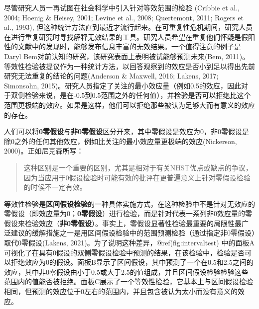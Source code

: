 \documentclass[
  letterpaper,
  DIV=11,
  numbers=noendperiod]{scrreprt}
\begin{document}
尽管研究人员一再试图在社会科学中引入针对等效范围的检验 (Cribbie et al.,
2004; Hoenig \& Heisey, 2001; Levine et al., 2008; Quertemont, 2011;
Rogers et al., 1993),
但这种统计方法直到最近才流行起来。在可重复性危机期间，研究人员在进行重复研究时寻找解释无效结果的工具。研究人员希望在重复他们怀疑是假阳性的文献中的发现时，能够发布信息丰富的无效结果。一个值得注意的例子是Daryl
Bem对前认知的研究，该研究表面上表明被试能够预测未来(Bem,
2011)。等效性检验被提议作为一种统计方法，以回答观察到的效应是否小到足以得出先前研究无法重复的结论的问题(Anderson
\& Maxwell, 2016; Lakens, 2017; Simonsohn,
2015)。研究人员指定了关注的最小效应量（例如0.5的效应，因此对于双侧检验来说，是在-0.5到0.5范围之外的任何值），并检验是否可以拒绝比这个范围更极端的效应。如果是这样，他们可以拒绝那些被认为足够大而有意义的效应的存在。

人们可以将\textbf{0零假设}与\textbf{非0零假设}区分开来，其中零假设是效应为0，非0零假设是除0之外的任何其他效应，例如比关注的最小效应量更极端的效应(Nickerson,
2000)。正如尼克森所写：

\begin{quote}
这种区别是一个重要的区别，尤其是相对于有关NHST优点或缺点的争议，因为当应用于0假设检验时可能有效的批评在更普遍意义上针对零假设检验的时候不一定有效。
\end{quote}

等效性检验是\textbf{区间假设检验}的一种具体实施方式，在这种检验中不是针对无效应的零假设（即效应量为0；\textbf{0零假设}）进行检验，而是针对代表一系列非0效应量的零假设来检验效应（\textbf{非0零假设}）。事实上，零假设显著性检验最重要的局限性最广泛建议的缓解措施之一是用区间假设检验中的范围预测检验（通过指定非0零假设）取代0零假设(Lakens,
2021)。为了说明这种差异，@ref(fig:intervaltest)
中的面板A可视化了在具有0假设的双侧零假设检验中预测的结果，在该检验中，检验是否可以拒绝效应为0的假设。面板B显示了区间假设，其中预测了一个在0.5和2.5之间的效应，其中非0零假设由小于0.5或大于2.5的值组成，并且区间假设检验检验这些范围内的值能否被拒绝。面板C展示了一个等效性检验，它基本上与区间假设检验相同，但预测的效应位于0左右的范围内，并且包含被认为太小而没有意义的效应。
\end{document}
